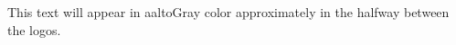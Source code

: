 \documentclass{article}
\begin{document}
\vfill
\textcolor{aaltoGray}{%
This text will appear in aaltoGray color approximately in the halfway
between the logos.}
\vfill
{}
\end{document}
